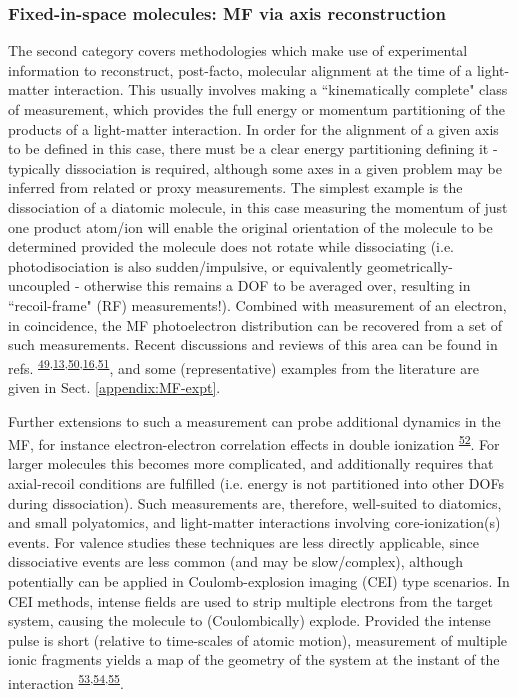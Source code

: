 \documentclass[10pt]{article}
\begin{document}
\subsubsection{Fixed-in-space molecules: MF via axis reconstruction\label{sec:fixed-in-space}}

The second category covers methodologies which make use of experimental information to reconstruct, post-facto, molecular alignment at the time of a light-matter interaction. This usually involves making a ``kinematically complete" class of measurement, which provides the full energy or momentum partitioning of the products of a light-matter interaction. In order for the alignment of a given axis to be defined in this case, there must be a clear energy partitioning defining it - typically dissociation is required, although some axes in a given problem may be inferred from related or proxy measurements. The simplest example is the dissociation of a diatomic molecule, in this case measuring the momentum of just one product atom/ion will enable the original orientation of the molecule to be determined 
provided the molecule does not rotate while dissociating (i.e. photodisociation is also sudden/impulsive, or equivalently geometrically-uncoupled - otherwise this remains a DOF to be averaged over, resulting in ``recoil-frame" (RF) measurements!). Combined with measurement of an electron, in coincidence, the MF photoelectron distribution can be recovered from a set of such measurements. Recent discussions and reviews of this area can be found in refs. \textsuperscript{\hyperref[csl:49]{49},\hyperref[csl:13]{13},\hyperref[csl:50]{50},\hyperref[csl:16]{16},\hyperref[csl:51]{51}}, and some (representative) examples from the literature are given in Sect. \ref{appendix:MF-expt}.


Further extensions to such a measurement can probe additional dynamics in the MF, for instance electron-electron correlation effects in double ionization \textsuperscript{\hyperref[csl:52]{52}}. %
For larger molecules this becomes more complicated, and additionally requires that axial-recoil conditions are fulfilled (i.e. energy is not partitioned into other DOFs during dissociation). Such measurements are, therefore, well-suited to diatomics, and small polyatomics, and light-matter interactions involving core-ionization(s) events. For valence studies these techniques are less directly applicable, since dissociative events are less common (and may be slow/complex), although potentially can be applied in Coulomb-explosion imaging (CEI) type scenarios. In CEI methods, intense fields are used to strip multiple electrons from the target system, causing the molecule to (Coulombically) explode. Provided the intense pulse is short (relative to time-scales of atomic motion), measurement of multiple ionic fragments yields a map of the geometry of the system at the instant of the interaction \textsuperscript{\hyperref[csl:53]{53},\hyperref[csl:54]{54},\hyperref[csl:55]{55}}. 
\end{document}
